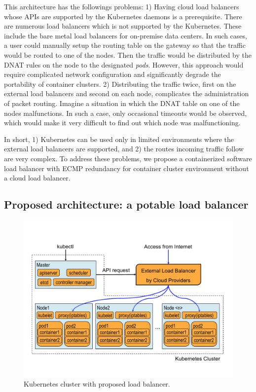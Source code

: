 This architecture has the followings problems: 
1) Having cloud load balancers whose APIs are supported by the Kubernetes daemons is a prerequisite. 
There are numerous load balancers which is not supported by the Kubernetes.
These include the bare metal load balancers for on-premise data centers.  
In such cases, a user could manually setup the routing table on the gateway so that the traffic would be routed to one of the nodes.
Then the traffic would be distributed by the DNAT rules on the node to the designated {\em pods}.
However, this approach would require complicated network configuration and significantly degrade the portability of container clusters.
2) Distributing the traffic twice, first on the external load balancers and second on each node, 
complicates the administration of packet routing. 
Imagine a situation in which the DNAT table on one of the nodes malfunctions.
In such a case, only occasional timeouts would be observed, which would make it very difficult to find out which node was malfunctioning.   

In short, 1) Kubernetes can be used only in limited environments where the external load balancers are supported, 
and 2) the routes incoming traffic follow are very complex.
%
To address these problems, we propose a containerized software load balancer with ECMP redundancy for container cluster environment without a cloud load balancer.

\subsection{Proposed architecture: a potable load balancer}

\begin{figure}
\includegraphics[width=\columnwidth]{Figs/K8sProposed}
\caption{Kubernetes cluster with proposed load balancer.}
\label{fig:K8sProposed}
\end{figure}


